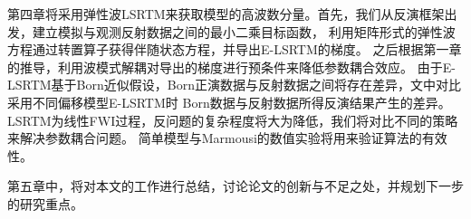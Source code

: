 第四章将采用弹性波LSRTM来获取模型的高波数分量。首先，我们从反演框架出发，建立模拟与观测反射数据之间的最小二乘目标函数，
利用矩阵形式的弹性波方程通过转置算子获得伴随状态方程，并导出E-LSRTM的梯度。
之后根据第一章的推导，利用波模式解耦对导出的梯度进行预条件来降低参数耦合效应。
由于E-LSRTM基于Born近似假设，Born正演数据与反射数据之间将存在差异，文中对比采用不同偏移模型E-LSRTM时
Born数据与反射数据所得反演结果产生的差异。
LSRTM为线性FWI过程，反问题的复杂程度将大为降低，我们将对比不同的策略来解决参数耦合问题。
简单模型与Marmousi的数值实验将用来验证算法的有效性。

第五章中，将对本文的工作进行总结，讨论论文的创新与不足之处，并规划下一步的研究重点。
